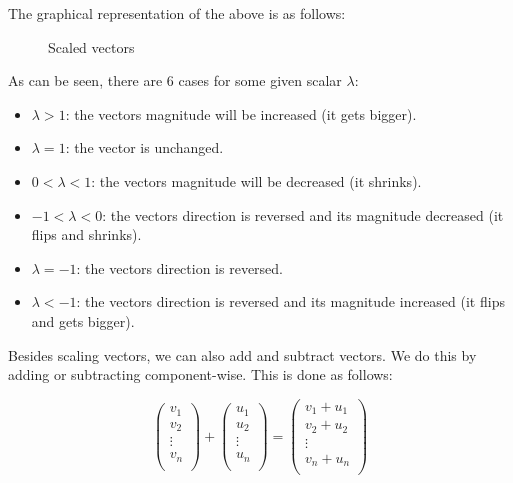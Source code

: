\documentclass[a4paper,oneside]{report}
\begin{document}
The graphical representation of the above is as follows:

\begin{figure}[h]
	\centering

	Scaled vectors
\end{figure}

As can be seen, there are 6 cases for some given scalar \( \lambda \):

\begin{itemize}
	\item{\( \lambda > 1 \): the vectors magnitude will be increased (it
		gets bigger).}
	\item{\( \lambda = 1 \): the vector is unchanged.}
	\item{\( 0 < \lambda < 1 \): the vectors magnitude will be decreased
		(it shrinks).}
	\item{\( -1 < \lambda < 0 \): the vectors direction is reversed and
		its magnitude decreased (it flips and shrinks).}
	\item{\( \lambda = -1 \): the vectors direction is reversed.}
	\item{\( \lambda < -1\): the vectors direction is reversed and
		its magnitude increased (it flips and gets bigger).}
\end{itemize}

Besides scaling vectors, we can also add and subtract vectors. We do this by
adding or subtracting component-wise. This is done as follows:

\[ \begin{pmatrix}
	v_1 \\
	v_2 \\
	\vdots \\
	v_n \\
\end{pmatrix} + \begin{pmatrix}
	u_1 \\
	u_2 \\
	\vdots \\
	u_n \\
\end{pmatrix} = \begin{pmatrix}
	v_1 + u_1 \\
	v_2 + u_2 \\
	\vdots \\
	v_n + u_n \\
\end{pmatrix} \]
\end{document}
